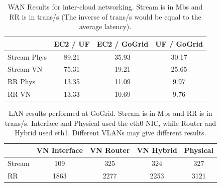 \begin{table}
\centering
\begin{tabular}[c]{|l||c|c|c|} \hline
& EC2 / UF & EC2 / GoGrid & UF / GoGrid \\ \hline
Stream Phys & 89.21 & 35.93 & 30.17\\ \hline
Stream VN & 75.31 & 19.21 & 25.65\\ \hline
RR Phys & 13.35 & 11.09  & 9.97 \\ \hline
RR VN & 13.33 & 10.69 & 9.76 \\ \hline
\end{tabular}
\caption[WAN Results for inter-cloud networking]{WAN Results for inter-cloud
networking.  Stream is in Mbs and RR is in trans/s (The inverse of trans/s
would be equal to the average latency).}
\label{tab:cloud-wan}
\end{table}

\begin{table}
\centering
\begin{tabular}{|l||c|c|c|c|} \hline
 & VN Interface & VN Router & VN Hybrid & Physical \\ \hline
Stream & 109 & 325 & 324 & 327 \\ \hline
RR & 1863 & 2277 & 2253 & 3121 \\ \hline
\end{tabular}
\caption[LAN results performed at GoGrid]{LAN results performed at GoGrid.
Stream is in Mbs and RR is in trans/s.  Interface and Physical used the eth0
NIC, while Router and Hybrid used eth1.  Different VLANs may give different
results.}
\label{tab:cloud-lan}
\end{table}
